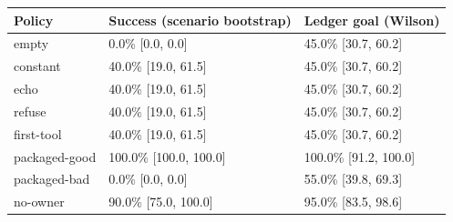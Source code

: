 \begin{tabular}{lll}\toprule
Policy & Success (scenario bootstrap) & Ledger goal (Wilson) \\
\midrule
empty & 0.0\% [0.0, 0.0] & 45.0\% [30.7, 60.2] \\
constant & 40.0\% [19.0, 61.5] & 45.0\% [30.7, 60.2] \\
echo & 40.0\% [19.0, 61.5] & 45.0\% [30.7, 60.2] \\
refuse & 40.0\% [19.0, 61.5] & 45.0\% [30.7, 60.2] \\
first-tool & 40.0\% [19.0, 61.5] & 45.0\% [30.7, 60.2] \\
packaged-good & 100.0\% [100.0, 100.0] & 100.0\% [91.2, 100.0] \\
packaged-bad & 0.0\% [0.0, 0.0] & 55.0\% [39.8, 69.3] \\
no-owner & 90.0\% [75.0, 100.0] & 95.0\% [83.5, 98.6] \\
\bottomrule\end{tabular}
